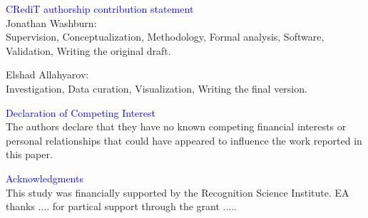 \documentclass[%
 amsmath,amssymb,
 aps,
prb,
floatfix, showkeys
]{revtex4-2}
\newcommand{\modif}[1]{\textcolor{blue}{#1}}
\begin{document}
 




\onecolumngrid


\vspace{0.3cm}

{\modif{ CRediT authorship contribution statement}} \\
Jonathan Washburn: \\
Supervision,
Conceptualization,
Methodology,
Formal analysis,
Software,
Validation,
Writing the original draft.

\vspace{0.20cm}

Elshad Allahyarov: \\
Investigation,
Data curation,
Visualization,
Writing the final version.  


{\modif{ Declaration of Competing Interest }} \\
The authors declare that they have no known competing financial interests or personal relationships that
could have appeared to influence the work reported in this paper.

{\modif{ Acknowledgments }} \\
This study was financially supported by the Recognition Science Institute.
EA thanks .... for partical support through the grant .....


\end{document}
